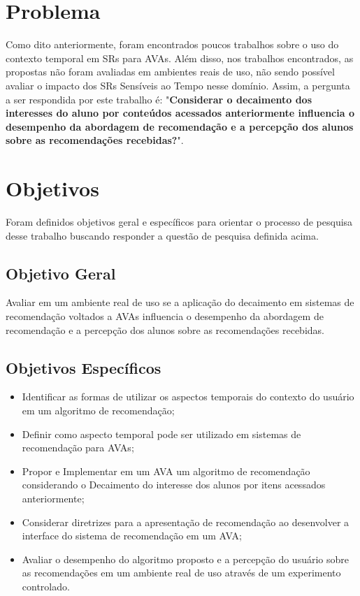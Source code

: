 \section{Problema}

Como dito anteriormente, foram encontrados poucos trabalhos sobre o uso do contexto temporal em SRs para AVAs. Além disso,
nos trabalhos encontrados, as propostas não foram avaliadas em ambientes reais de uso, não sendo possível avaliar o
impacto dos SRs Sensíveis ao Tempo nesse domínio. Assim, a pergunta a ser respondida por este trabalho
é: "\textbf{Considerar o decaimento dos interesses do aluno por conteúdos acessados anteriormente influencia o desempenho
da abordagem de recomendação e a percepção dos alunos sobre as recomendações recebidas?}".

\section{Objetivos}

Foram definidos objetivos geral e específicos para orientar o processo de pesquisa desse trabalho buscando responder a questão
de pesquisa definida acima.

\subsection{Objetivo Geral}

Avaliar em um ambiente real de uso se a aplicação do decaimento em sistemas de recomendação voltados a AVAs influencia o
desempenho da abordagem de recomendação e a percepção dos alunos sobre as recomendações recebidas.

\subsection{Objetivos Específicos}

\begin{itemize}
\item Identificar as formas de utilizar os aspectos temporais do contexto do usuário em um algoritmo de recomendação;
\item Definir como aspecto temporal pode ser utilizado em sistemas de recomendação para AVAs;
\item Propor e Implementar em um AVA um algoritmo de recomendação considerando o Decaimento do interesse dos alunos por itens
acessados anteriormente;
\item Considerar diretrizes para a apresentação de recomendação ao desenvolver a interface do sistema de recomendação
em um AVA;
\item Avaliar o desempenho do algoritmo proposto e a percepção do usuário sobre as recomendações em um ambiente real de uso
através de um experimento controlado.
\end{itemize}

